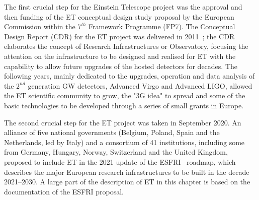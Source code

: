 \documentclass[graybox, nosecnum]{svmult}
\begin{document}
The first crucial step for the Einstein Telescope project was the approval and then funding of the ET conceptual design study proposal by the European Commission within the $7^{th}$ Framework Programme (FP7). The Conceptual Design Report (CDR) for the ET project was delivered in 2011~\cite{ET-CDR}; the CDR elaborates the concept of Research Infrastructures or Observatory, focusing the attention on the infrastructure to be designed and realised for ET with the capability to allow future upgrades of the hosted detectors for decades. 
The following years, mainly dedicated to the upgrades, operation and data analysis of the $2^{nd}$ generation GW detectors, Advanced Virgo and Advanced LIGO, allowed the ET scientific community to grow, the "3G idea" to spread and some of the basic technologies to be developed through a series of small grants in Europe.

The second crucial step for the ET project was taken in September 2020.  
An alliance of five national governments (Belgium, Poland, Spain and the Netherlands, led by Italy) and a consortium of 41 institutions, including some from Germany, Hungary, Norway, Switzerland and the United Kingdom, proposed to include ET in the 2021 update of the ESFRI~\cite{ESFRI} roadmap, which describes the major European research infrastructures to be built in the decade 2021--2030. A large part of the description of ET in this chapter is based on the documentation of the ESFRI proposal. 
\end{document}
